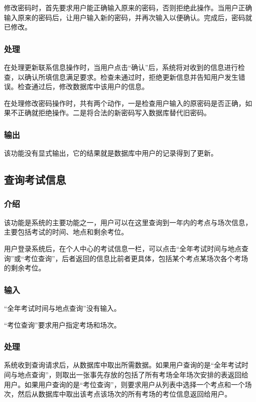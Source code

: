 修改密码时，首先要求用户能正确输入原来的密码，否则拒绝此操作。当用户正确输入原来的密码后，让用户输入新的密码，并再次输入以便确认。完成后，密码就已修改。

\subsubsection{处理}
在处理更新联系信息操作时，当用户点击“确认”后，系统将对收到的信息进行检查，以确认所填信息满足要求。检查未通过时，拒绝更新信息并告知用户发生错误。检查通过后，修改数据库中该用户的信息。

在处理修改密码操作时，共有两个动作，一是检查用户输入的原密码是否正确，如果不正确就拒绝操作。二是将合法的新密码写入数据库替代旧密码。

\subsubsection{输出}
该功能没有显式输出，它的结果就是数据库中用户的记录得到了更新。

\subsection{查询考试信息}

\subsubsection{介绍}
该功能是系统的主要功能之一，用户可以在这里查询到一年内的考点与场次信息，主要包括考试的时间、地点和剩余考位。

用户登录系统后，在个人中心的考试信息一栏，可以点击“全年考试时间与地点查询”或“考位查询”，后者返回的信息比前者更具体，包括某个考点某场次各个考场的剩余考位。

\subsubsection{输入}
“全年考试时间与地点查询”没有输入。

“考位查询”要求用户指定考场和场次。

\subsubsection{处理}
系统收到查询请求后，从数据库中取出所需数据。如果用户查询的是“全年考试时间与地点查询”，则取出一张事先存放的包括了所有考场全年场次安排的表返回给用户。如果用户查询的是“考位查询”，则要求用户从列表中选择一个考点和一个场次，然后从数据库中取出该考点该场次的所有考场的考位信息返回给用户。

